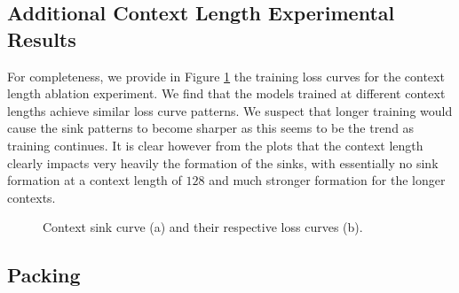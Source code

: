 \documentclass{article} %
\begin{document}
\subsection{Additional Context Length Experimental Results}

For completeness, we provide in Figure \ref{fig:context-loss-curves} the training loss curves for the context length ablation experiment. We find that the models trained at different context lengths achieve similar loss curve patterns. We suspect that longer training would cause the sink patterns to become sharper as this seems to be the trend as training continues. It is clear however from the plots that the context length clearly impacts very heavily the formation of the sinks, with essentially no sink formation at a context length of $128$ and much stronger formation for the longer contexts.

\begin{figure}[H]
    \centering
    \qquad
    \caption{Context sink curve (a) and their respective loss curves (b).}%
    \label{fig:context-loss-curves}%
    \vspace{-10pt}
\end{figure}


\subsection{Packing}
\label{app:packing-details}
\end{document}
